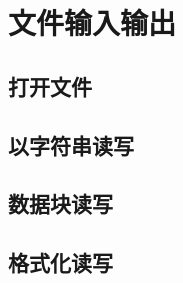 \chapter{文件输入输出} \label{文件输入输出}
    \section{打开文件}
    \section{以字符串读写}
    \section{数据块读写}
    \section{格式化读写}